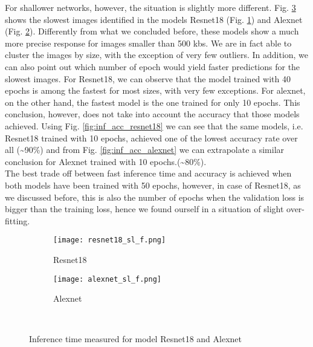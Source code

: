 For shallower networks, however, the situation is slightly more different. Fig. \ref{fig:sl_f_shallow} shows the slowest images identified in the models Resnet18 (Fig. \ref{fig:resnet18_sl_f}) and Alexnet (Fig. \ref{fig:alexnet_sl_f}). Differently from what we concluded before, these models show a much more precise response for images smaller than 500 kbs. We are in fact able to cluster the images by size, with the exception of very few outliers. In addition, we can also point out which number of epoch would yield faster predictions for the slowest images. For Resnet18, we can observe that the model trained with 40 epochs is among the fastest for most sizes, with very few exceptions. For alexnet, on the other hand, the fastest model is the one trained for only 10 epochs. This conclusion, however, does not take into account the accuracy that those models achieved. Using Fig. \ref{fig:inf_acc_resnet18} we can see that the same models, i.e. Resnet18 trained with 10 epochs, achieved one of the lowest accuracy rate over all (\textasciitilde90\%) and from Fig. \ref{fig:inf_acc_alexnet} we can extrapolate a similar conclusion for Alexnet trained with 10 epochs.(\textasciitilde80\%). \\
The best trade off between fast inference time and accuracy is achieved when both models have been trained with 50 epochs, however, in case of Resnet18, as we discussed before, this is also the number of epochs when the validation loss is bigger than the training loss, hence we found ourself in a situation of slight over-fitting. \\
\begin{figure}[h]
     \begin{subfigure}{0.5\textwidth}
	    \texttt{[image: resnet18\_sl\_f.png]}
	    \caption{Resnet18}
         \label{fig:resnet18_sl_f}
         
     \end{subfigure}
     \hfill
     \begin{subfigure}{0.5\textwidth}
	    \texttt{[image: alexnet\_sl\_f.png]}
	    \caption{Alexnet}
        \label{fig:alexnet_sl_f}
        
     \end{subfigure}\\
     \caption{Inference time measured for model Resnet18 and Alexnet}
        \label{fig:sl_f_shallow}
\end{figure}


